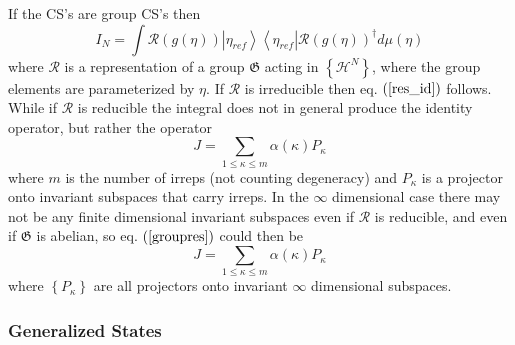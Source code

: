\documentclass[aps,preprint]{revtex4}
\begin{document}
If the CS's are group CS's then 
\begin{equation}
I_{N}=\int \mathcal{R}\left( g\left( \eta \right) \right) \left\vert \eta
_{ref}\right\rangle \left\langle \eta _{ref}\right\vert \mathcal{R}\left(
g\left( \eta \right) \right) ^{\dagger }d\mu \left( \eta \right)
\label{groupres}
\end{equation}%
where $\mathcal{R}$ is a representation of a group $\mathfrak{G}$ acting in $%
\left\{ \mathcal{H}^{N}\right\} $, where the group elements are
parameterized by $\eta $. If $\mathcal{R}$ is irreducible then eq. $\left( %
\ref{res_id}\right) $ follows. While if $\mathcal{R}$ is reducible the
integral does not in general produce the identity operator, but rather the
operator 
\begin{equation}
J=\sum_{1\leq \kappa \leq m}\alpha \left( \kappa \right) P_{\kappa }
\end{equation}%
where $m$ is the number of irreps (not counting degeneracy) and $P_{\kappa }$
is a projector onto invariant subspaces that carry irreps. In the $\infty $
dimensional case there may not be any finite dimensional invariant subspaces
even if $\mathcal{R}$ is reducible, and even if $\mathfrak{G}$ is abelian,
so eq. $\left( \ref{groupres}\right) $ could then be 
\begin{equation}
J=\sum_{1\leq \kappa \leq m}\alpha \left( \kappa \right) P_{\kappa }
\end{equation}%
where $\left\{ P_{\kappa }\right\} $ are all projectors onto invariant $%
\infty $ dimensional subspaces.

\subsubsection{Generalized States}
\end{document}
